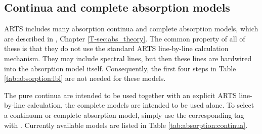\subsection{Continua and complete absorption models}
\label{sec:absorption:continua}

ARTS includes many absorption continua and complete absorption models,
which are described in \theory, Chapter \ref{T-sec:abs_theory}.  The
common property of all of these is that they do not use the standard
ARTS line-by-line calculation mechanism.  They may include spectral
lines, but then these lines are hardwired into the absorption model
itself.  Consequently, the first four steps in Table
\ref{tab:absorption:lbl} are not needed for these models.  

The pure continua are intended to be used together with an explicit ARTS
line-by-line calculation, the complete models are intended to be used alone.
To select a continuum or complete absorption model, simply use the
corresponding tag with .  Currently available
models are listed in Table \ref{tab:absorption:continua}.

